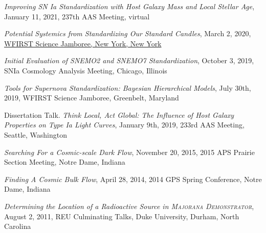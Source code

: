 \documentclass[margin]{res}
\begin{document}
\begin{resume}

\hangindent=15pt 
{\sl Improving SN Ia Standardization with Host Galaxy Mass and Local Stellar Age}, January 11, 2021, 237th AAS Meeting, virtual
\vspace{-12pt}

\hangindent=15pt 
{\sl Potential Systemics from Standardizing Our Standard Candles}, March 2, 2020, \href{https://indico.flatironinstitute.org/event/122/#43-potential-systemics-from-st}{WFIRST Science Jamboree, New York, New York}
\vspace{-12pt}


\hangindent=15pt 
{\sl Initial Evaluation of SNEMO2 and SNEMO7 Standardization}, October 3, 2019, SNIa Cosmology Analysis Meeting, Chicago, Illinois
\vspace{-12pt}

\hangindent=15pt 
{\sl Tools for Supernova Standardization: 
Bayesian Hierarchical Models}, July 30th, 2019,
WFIRST Science Jamboree, Greenbelt, Maryland
\vspace{-12pt}




\hangindent=15pt 
Dissertation Talk. {\sl Think Local, Act Global: The Influence of Host Galaxy Properties on Type Ia Light Curves}, January 9th, 2019,
233rd AAS Meeting, Seattle, Washington
\vspace{-12pt}


\hangindent=15pt 
{\sl Searching For a Cosmic-scale Dark Flow}, November 20, 2015,
2015 APS Prairie Section Meeting, Notre Dame, Indiana
\vspace{-12pt}

\hangindent=15pt 
{\sl Finding A Cosmic Bulk Flow}, April 28, 2014, 2014 GPS Spring Conference, Notre Dame, Indiana
\vspace{-12pt}

\hangindent=15pt 
{\sl Determining the Location of a Radioactive Source in \textsc{Majorana Demonstrator}}, August 2, 2011, REU Culminating Talks, Duke University, Durham, North Carolina


\end{resume}
\end{document}
